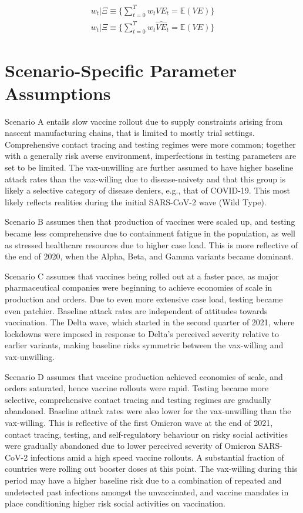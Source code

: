 \documentclass[12pt]{article}
\begin{document}
\begin{eqnarray}
	w_t | \Xi \equiv \{ \sum_{t=0}^{T} w_{t} VE_{t} = \mathbb{E}(VE)  \} \\
	w_t | \Xi \equiv \{ \sum_{t=0}^{T} w_{t} \hat{VE}_{t} = \mathbb{E}(VE)  \}
\end{eqnarray}

\section{Scenario-Specific Parameter Assumptions}

Scenario A entails slow vaccine rollout due to supply constraints arising from nascent manufacturing chains, that is limited to mostly trial settings. Comprehensive contact tracing and testing regimes were more common; together with a generally risk averse environment, imperfections in testing parameters are set to be limited. The vax-unwilling are further assumed to have higher baseline attack rates than the vax-willing due to disease-naivety and that this group is likely a selective category of disease deniers, e.g., that of COVID-19. This most likely reflects realities during the initial SARS-CoV-2 wave (Wild Type).

Scenario B assumes then that production of vaccines were scaled up, and testing became less comprehensive due to containment fatigue in the population, as well as stressed healthcare resources due to higher case load. This is more reflective of the end of 2020, when the Alpha, Beta, and Gamma variants became dominant.

Scenario C assumes that vaccines being rolled out at a faster pace, as major pharmaceutical companies were beginning to achieve economies of scale in production and orders. Due to even more extensive case load, testing became even patchier. Baseline attack rates are independent of attitudes towards vaccination. The Delta wave, which started in the second quarter of 2021, where lockdowns were imposed in response to Delta's perceived severity relative to earlier variants, making baseline risks symmetric between the vax-willing and vax-unwilling.

Scenario D assumes that vaccine production achieved economies of scale, and orders saturated, hence vaccine rollouts were rapid. Testing became more selective, comprehensive contact tracing and testing regimes are gradually abandoned. Baseline attack rates were also lower for the vax-unwilling than the vax-willing. This is reflective of the first Omicron wave at the end of 2021, contact tracing, testing, and self-regulatory behaviour on risky social activities were gradually abandoned due to lower perceived severity of Omicron SARS-CoV-2 infections amid a high speed vaccine rollouts. A substantial fraction of countries were rolling out booster doses at this point. The vax-willing during this period may have a higher baseline risk due to a combination of repeated and undetected past infections amongst the unvaccinated, and vaccine mandates in place conditioning higher risk social activities on vaccination.
\end{document}
